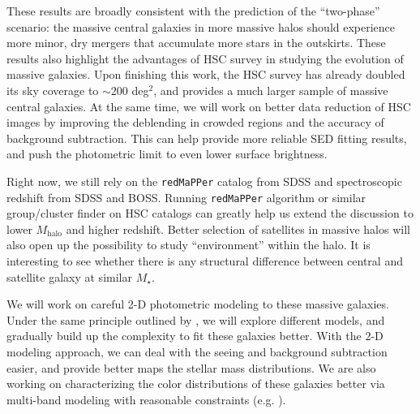 \documentclass{emulateapj}
\def\redm{\texttt{redMaPPer}}
\def\mstar{{$M_{\star}$}}
\def\mhalo{{$M_{\mathrm{halo}}$}}
\begin{document}
\begin{CJK*}{UTF8}{gbsn}
    These results are broadly consistent with the prediction of the ``two-phase''
    scenario: the massive central galaxies in more massive halos should experience 
    more minor, dry mergers that accumulate more stars in the outskirts. 
    These results also highlight the advantages of HSC survey in studying the 
    evolution of massive galaxies.
    Upon finishing this work, the HSC survey has already doubled its sky 
    coverage to $\sim 200$ deg$^2$, and provides a much larger sample of massive 
    central galaxies. 
    At the same time, we will work on better data reduction of HSC images by 
    improving the deblending in crowded regions and the accuracy of background 
    subtraction. 
    This can help provide more reliable SED fitting results, and push the 
    photometric limit to even lower surface brightness.  
    
    Right now, we still rely on the \redm{} catalog from SDSS and spectroscopic 
    redshift from SDSS and BOSS.  
    Running \redm{} algorithm or similar group/cluster finder on HSC catalogs 
    can greatly help us extend the discussion to lower \mhalo{} and higher 
    redshift. 
    Better selection of satellites in massive halos will also open up the 
    possibility to study ``environment'' within the halo.
    It is interesting to see whether there is any structural difference
    between central and satellite galaxy at similar \mstar{}.
    
    We will work on careful 2-D photometric modeling to these massive galaxies.
    Under the same principle outlined by \citealt{Huang2013a}, we will explore 
    different models, and gradually build up the complexity to fit these galaxies 
    better.
    With the 2-D modeling approach, we can deal with the seeing and background
    subtraction easier, and provide better maps the stellar mass distributions. 
    We are also working on characterizing the color distributions of these 
    galaxies better via multi-band modeling with reasonable constraints (e.g. 
    \citealt{Huang2016}). 
    

\end{CJK*}
\end{document}
